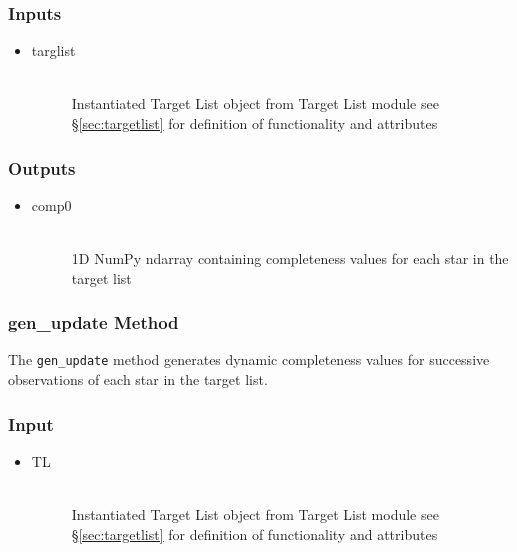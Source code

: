 \documentclass[cleanfoot]{asme2ej}
\begin{document}
\subsubsection*{Inputs}
\begin{itemize}
    \item 
    \begin{description}
        \item[targlist] \hfill \\
        Instantiated Target List object from Target List module see \S\ref{sec:targetlist} for definition of functionality and attributes
    \end{description}
\end{itemize}

\subsubsection*{Outputs}
\begin{itemize}
    \item 
    \begin{description}
        \item[comp0] \hfill \\
        1D NumPy ndarray containing completeness values for each star in the target list
    \end{description}
\end{itemize}

\subsubsection{gen\_update Method} \label{sec:genupdatetask}
The \verb+gen_update+ method generates dynamic completeness values for successive observations of each star in the target list.

\subsubsection*{Input}
\begin{itemize}
    \item 
    \begin{description}
            \item[TL] \hfill \\
            Instantiated Target List object from Target List module see \S\ref{sec:targetlist} for definition of functionality and attributes
    \end{description}
\end{itemize}
\end{document}
